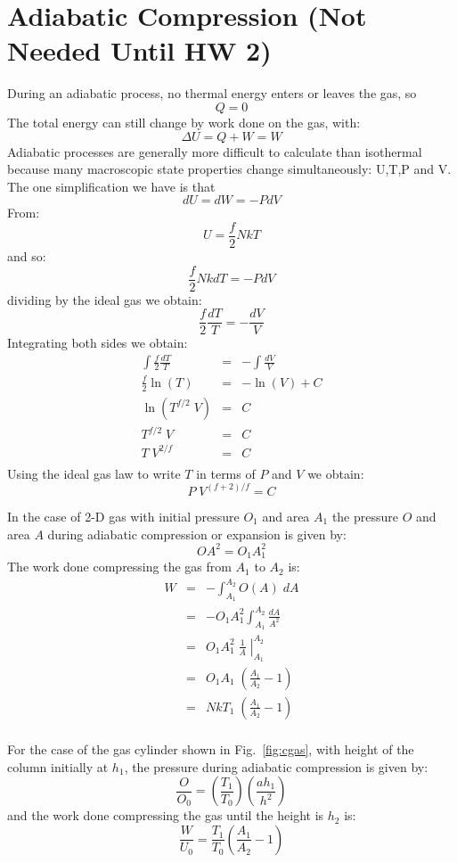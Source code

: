 \documentclass[12pt]{article}
\begin{document}
\section{Adiabatic Compression (Not Needed Until HW 2)}

During an adiabatic process, no thermal energy enters or leaves the gas, so
$$Q = 0$$
The total energy can still change by work done on the gas, with:
$$\Delta U = Q + W = W$$
Adiabatic processes are generally more difficult to calculate than
isothermal because many macroscopic state properties change
simultaneously: U,T,P and V.  The one simplification we have is that
$$dU = dW = - P dV$$
From:
$$U = \frac{f}{2} N k T$$
and so:
$$\frac{f}{2} N k dT = -P dV$$
dividing by the ideal gas we obtain:
$$\frac{f}{2} \frac{dT}{T} = - \frac{dV}{V}$$
Integrating both sides we obtain:
\begin{eqnarray*}
\int \frac{f}{2} \frac{dT}{T} &=& - \int \frac{dV}{V} \\
\frac{f}{2} \ln(T) &=& -\ln(V) + C \\
\ln\left( T^{f/2}\;V \right) &=& C \\
T^{f/2}\;V &=& C \\
T\;V^{2/f} &=& C \\
\end{eqnarray*}
Using the ideal gas law to write $T$ in terms of $P$ and $V$ we obtain:
$$P\;V^{(f+2)/f} = C $$

In the case of 2-D gas with initial pressure $O_1$ and area $A_1$ the
pressure $O$ and area $A$ during adiabatic compression or expansion is
given by:
$$ O A^2 = O_1 A_1^2 $$
The work done compressing the gas from $A_1$ to $A_2$ is:
\begin{eqnarray*}
W &=& - \int_{A_1}^{A_2} O(A) \; dA \\
  &=& - O_1 A_1^2 \int_{A_1}^{A_2} \frac{dA}{A^2} \\
  &=&  O_1 A_1^2 \; \left. \frac{1}{A} \; \right|_{A_1}^{A_2} \\
  &=&  O_1 A_1   \; \left( \frac{A_1}{A_2} - 1 \right) \\
  &=&  N k T_1  \; \left( \frac{A_1}{A_2} - 1 \right) \\
\end{eqnarray*}

For the case of the gas cylinder shown in Fig.~\ref{fig:cgas}, with
height of the column initially at $h_1$, the pressure during adiabatic
compression is given by:
\begin{equation}
\label{eqn:oadi}
\frac{O}{O_0} = \left( \frac{T_1}{T_0} \right) \left( \frac{a h_1}{h^2} \right) 
\end{equation}
and the work done compressing the gas until the height is $h_2$ is:
\begin{equation}
\label{eqn:wadi}
\frac{W}{U_0} = \frac{T_1}{T_0} \left( \frac{A_1}{A_2} - 1 \right)
\end{equation}
\end{document}
